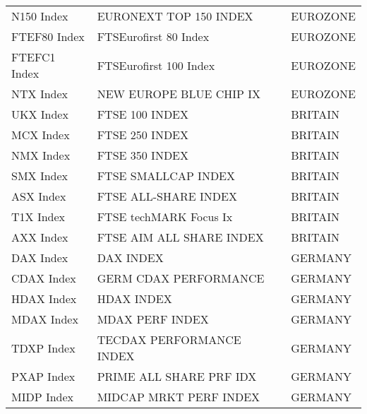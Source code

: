 \begin {table}[H]
\begin{center}
\begin{tabu}{| l l l |}
N150 Index & EURONEXT TOP 150 INDEX & EUROZONE \\ 
FTEF80 Index & FTSEurofirst 80  Index & EUROZONE \\ 
FTEFC1 Index & FTSEurofirst 100 Index & EUROZONE \\ 
NTX Index & NEW EUROPE BLUE CHIP IX & EUROZONE \\ 
UKX Index & FTSE 100 INDEX & BRITAIN \\ 
MCX Index & FTSE 250 INDEX & BRITAIN \\ 
NMX Index & FTSE 350 INDEX & BRITAIN \\ 
SMX Index & FTSE SMALLCAP INDEX & BRITAIN \\ 
ASX Index & FTSE ALL-SHARE INDEX & BRITAIN \\ 
T1X Index & FTSE techMARK Focus Ix & BRITAIN \\ 
AXX Index & FTSE AIM ALL SHARE INDEX & BRITAIN \\ 
DAX Index & DAX INDEX & GERMANY \\ 
CDAX Index & GERM CDAX  PERFORMANCE & GERMANY \\ 
HDAX Index & HDAX INDEX & GERMANY \\ 
MDAX Index & MDAX PERF INDEX & GERMANY \\ 
TDXP Index & TECDAX PERFORMANCE INDEX & GERMANY \\ 
PXAP Index & PRIME ALL SHARE PRF IDX & GERMANY \\ 
MIDP Index & MIDCAP MRKT PERF INDEX & GERMANY \\ 

\hline
\end{tabu}
\hspace*{-3cm}
\small
\end{center}
\end{table}


